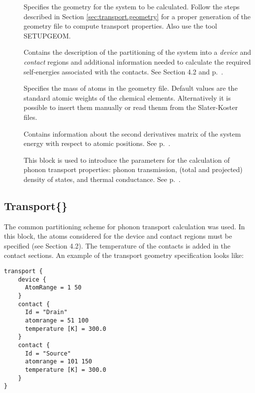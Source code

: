 \begin{description}
\item[] Specifies the geometry for the system to be calculated. 
	Follow the steps described in Section \ref{sec:transport.geometry} for a proper generation 
	of the geometry file to compute transport properties. Also use the tool SETUPGEOM.
\item[] Contains the description of the partitioning of the system into a 
	{\em device} and {\em contact} regions and additional information needed to calculate the 
	required self-energies associated with the contacts. 
	See Section 4.2 and p.~.
\item[]  Specifies the mass of atoms in the geometry file. 
	Default values are the standard atomic weights of the chemical elements. Alternatively
	it is possible to insert them manually or read thenm from the Slater-Koster files.
\item[] Contains information about the second derivatives matrix of the system energy 
	with respect to atomic positions. See  p.~.
\item[] This block is used to introduce the parameters for the calculation of 
	phonon transport properties: phonon transmission, (total and projected) density of states, 
	and thermal conductance. See  p.~.
\end{description}

\subsection{Transport\{\}}
\label{sec:phonon.Transport}

The common partitioning scheme for phonon transport calculation was used. 
In this block, the atoms considered for the device and contact regions must be specified 
(see Section 4.2). 
The temperature of the contacts is added in the contact sections. 
An example of the transport geometry specification looks like:

\begin{verbatim}
transport {
    device {
      AtomRange = 1 50
    }
    contact {
      Id = "Drain"
      atomrange = 51 100
      temperature [K] = 300.0
    }
    contact {
      Id = "Source"
      atomrange = 101 150
      temperature [K] = 300.0
    }
}
\end{verbatim}


